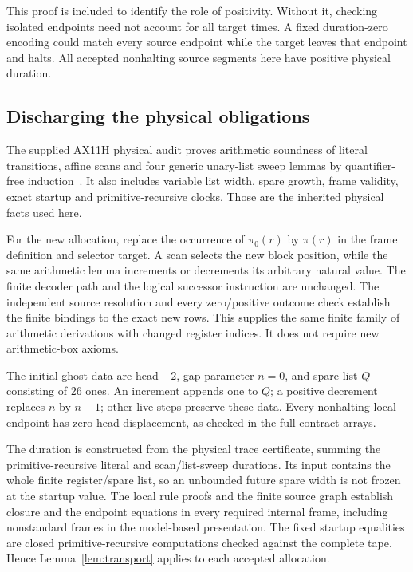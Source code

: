 \documentclass[11pt,letterpaper]{article}
\begin{document}
This proof is included to identify the role of positivity. Without it, checking isolated endpoints need not account for all target times. A fixed duration-zero encoding could match every source endpoint while the target leaves that endpoint and halts. All accepted nonhalting source segments here have positive physical duration.

\subsection{Discharging the physical obligations}

The supplied AX11H physical audit proves arithmetic soundness of literal transitions, affine scans and four generic unary-list sweep lemmas by quantifier-free induction~\cite{physical,transport}. It also includes variable list width, spare growth, frame validity, exact startup and primitive-recursive clocks. Those are the inherited physical facts used here.

For the new allocation, replace the occurrence of $\pi_0(r)$ by $\pi(r)$ in the frame definition and selector target. A scan selects the new block position, while the same arithmetic lemma increments or decrements its arbitrary natural value. The finite decoder path and the logical successor instruction are unchanged. The independent source resolution and every zero/positive outcome check establish the finite bindings to the exact new rows. This supplies the same finite family of arithmetic derivations with changed register indices. It does not require new arithmetic-box axioms.

The initial ghost data are head $-2$, gap parameter $n=0$, and spare list $Q$ consisting of 26 ones. An increment appends one to $Q$; a positive decrement replaces $n$ by $n+1$; other live steps preserve these data. Every nonhalting local endpoint has zero head displacement, as checked in the full contract arrays.\par

The duration is constructed from the physical trace certificate, summing the primitive-recursive literal and scan/list-sweep durations. Its input contains the whole finite register/spare list, so an unbounded future spare width is not frozen at the startup value. The local rule proofs and the finite source graph establish closure and the endpoint equations in every required internal frame, including nonstandard frames in the model-based presentation. The fixed startup equalities are closed primitive-recursive computations checked against the complete tape. Hence Lemma~\ref{lem:transport} applies to each accepted allocation.
\end{document}
